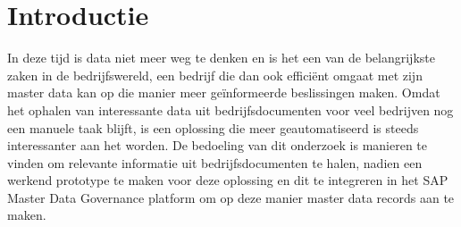 
\section{Introductie}%
\label{sec:introductie}

%
%
%
%
%

In deze tijd is data niet meer weg te denken en is het een van de belangrijkste zaken in de bedrijfswereld, een bedrijf die dan ook efficiënt omgaat met zijn master data kan op die manier meer geïnformeerde beslissingen maken. Omdat het ophalen van interessante data uit bedrijfsdocumenten voor veel bedrijven nog een manuele taak blijft, is een oplossing die meer geautomatiseerd is steeds interessanter aan het worden.  De bedoeling van dit onderzoek is manieren te vinden om relevante informatie uit bedrijfsdocumenten te halen, nadien een werkend prototype te maken voor deze oplossing en dit te integreren in het SAP Master Data Governance platform om op deze manier master data records aan te maken. 

